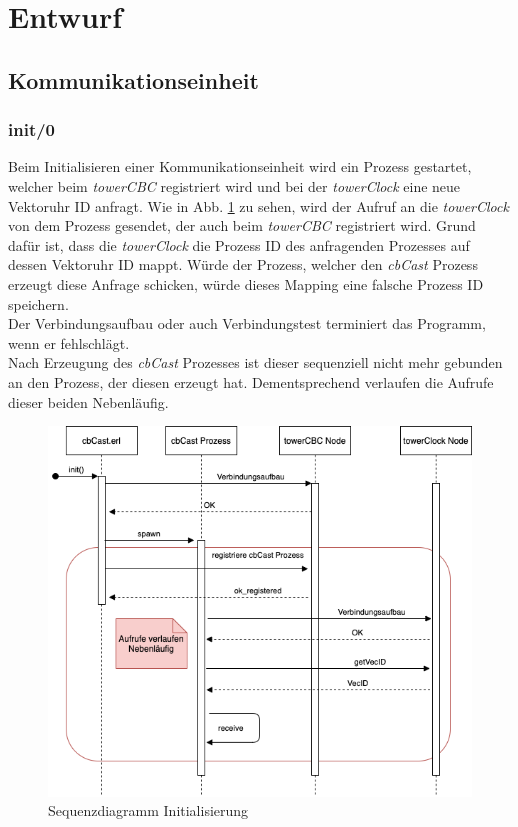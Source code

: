 \section{Entwurf}

\subsection{Kommunikationseinheit} \label{commModule}

\subsubsection{init/0}

Beim Initialisieren einer Kommunikationseinheit wird ein Prozess gestartet, welcher beim \textit{towerCBC} registriert wird und bei der \textit{towerClock} eine neue Vektoruhr ID anfragt. Wie in Abb. \ref{fig:sequence_cbCast_init} zu sehen, wird der Aufruf an die \textit{towerClock} von dem Prozess gesendet, der auch beim \textit{towerCBC} registriert wird. Grund dafür ist, dass die \textit{towerClock} die Prozess ID des anfragenden Prozesses auf dessen Vektoruhr ID mappt. Würde der Prozess, welcher den \textit{cbCast} Prozess erzeugt diese Anfrage schicken, würde dieses Mapping eine falsche Prozess ID speichern.
\\Der Verbindungsaufbau oder auch Verbindungstest terminiert das Programm, wenn er fehlschlägt.
\\Nach Erzeugung des \textit{cbCast} Prozesses ist dieser sequenziell nicht mehr gebunden an den Prozess, der diesen erzeugt hat. Dementsprechend verlaufen die Aufrufe dieser beiden Nebenläufig.

\begin{figure}[htbp]
\begin{center}
\includegraphics[scale=0.55]{Latex/Bilder/Sequenzdiagramm_cbCast.png}
\caption{\label{fig:sequence_cbCast_init} Sequenzdiagramm Initialisierung}
\end{center}
\end{figure}

